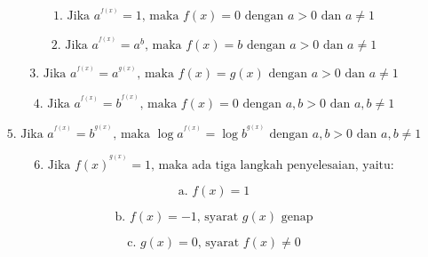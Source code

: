 \begin{eulernotebook}
\begin{eulercomment}
\begin{eulercomment}
\begin{eulercomment}
\end{eulercomment}
\begin{eulerformula}
\[
\text{1. Jika } a^{^{f(x)}} = 1 \text{, maka } f(x)=0 \text{ dengan } a>0 \text{ dan } a \neq 1
\]
\end{eulerformula}
\begin{eulercomment}
\end{eulercomment}
\begin{eulerformula}
\[
\text{2. Jika } a^{^{f(x)}} = a^b \text{, maka } f(x)=b \text{ dengan } a>0 \text{ dan } a \neq 1
\]
\end{eulerformula}
\begin{eulercomment}
\end{eulercomment}
\begin{eulerformula}
\[
\text{3. Jika } a^{^{f(x)}} = a^{^{g(x)}} \text{, maka } f(x)=g(x) \text{ dengan } a>0 \text{ dan } a \neq 1
\]
\end{eulerformula}
\begin{eulercomment}
\end{eulercomment}
\begin{eulerformula}
\[
\text{4. Jika } a^{^{f(x)}} = b^{^{f(x)}} \text{, maka } f(x)=0 \text{ dengan } a,b>0 \text{ dan } a,b \neq 1
\]
\end{eulerformula}
\begin{eulercomment}
\end{eulercomment}
\begin{eulerformula}
\[
\text{5. Jika } a^{^{f(x)}} = b^{^{g(x)}} \text{, maka } \log a^{^{f(x)}}=\log b^{^{g(x)}} \text{ dengan } a,b>0 \text{ dan } a,b \neq 1
\]
\end{eulerformula}
\begin{eulercomment}
\end{eulercomment}
\begin{eulerformula}
\[
\text{6. Jika } f(x)^{^{g(x)}} = 1 \text{, maka ada tiga langkah penyelesaian, yaitu:}
\]
\end{eulerformula}
\begin{eulerformula}
\[
\text{a. } f(x)=1
\]
\end{eulerformula}
\begin{eulerformula}
\[
\text{b. } f(x)=-1 \text{, syarat } g(x) \text{ genap}
\]
\end{eulerformula}
\begin{eulerformula}
\[
\text{c. }g(x)=0 \text{, syarat } f(x) \neq 0
\]
\end{eulerformula}
\begin{eulercomment}

\end{eulercomment}
\end{eulercomment}
\end{eulercomment}
\end{eulernotebook}
